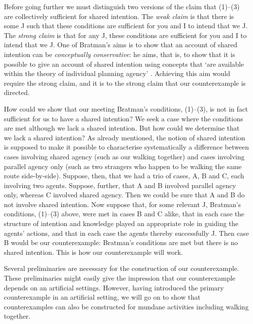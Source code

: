 \documentclass[12pt,\papersize]{extarticle}
\begin{document}
Before going further we must distinguish two versions of the claim that (1)--(3) are collectively sufficient for shared intention.
The \emph{weak claim} is that there is some J such that these conditions are sufficient for you and I to intend that we J.
The \emph{strong claim} is that for any J, these conditions are sufficient for you and I to intend that we J.
One of Bratman's aims is to show that an account of shared intention can be \emph{conceptually conservative}:
he aims, that is, to show that it is possible to give an account of shared intention using concepts that `are available within the theory of individual planning agency' \citep[p.\ 163]{Bratman:2009lv}.  
Achieving this aim would require the strong claim, and it is to the strong claim that our counterexample is directed. 





How could we show that our meeting Bratman's conditions, (1)--(3), is not in fact sufficient for us to have a shared intention? 
We seek a case where the conditions are met although we lack a shared intention.
But how could we determine that we lack a shared intention?
As already mentioned, the notion of shared intention is supposed to 
	make it possible to 
	characterise systematically a difference between 
		cases involving shared agency (such as our walking together)
		and
		cases involving parallel agency only (such as two strangers who happen to be walking the same route side-by-side). 
Suppose, then, that we had a trio of cases, A, B and C, each involving two agents.
Suppose, further, that A and B involved parallel agency only, whereas C involved shared agency.
Then we could be sure that A and B do not involve shared intention.
Now suppose 
	that, for some relevant J, Bratman's conditions, (1)--(3) above, were met in cases B and C alike, 
	that in each case the structure of intention and knowledge played an appropriate role in guiding the agents' actions,
	and that in each case the agents thereby successfully J.
Then case B would be our counterexample:
Bratman's conditions are met but there is no shared intention.
This is how our counterexample will work.

Several preliminaries are necessary for the construction of our counterexample. 
These preliminaries might easily give the impression that our counterexample depends on an artificial settings. 
However, having introduced the primary counterexample in an artificial setting, we will  go on to show that counterexamples can also be constructed for mundane activities including walking together.
\end{document}
